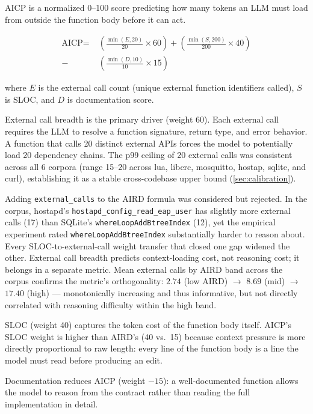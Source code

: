 \documentclass[10pt,twocolumn,letterpaper]{article}
\begin{document}
AICP is a normalized 0--100 score predicting how many tokens an LLM
must load from outside the function body before it can act.

\begin{align}
\text{AICP} = &\;\left(\frac{\min(E, 20)}{20} \times 60\right)
             + \left(\frac{\min(S, 200)}{200} \times 40\right) \nonumber \\
             - &\;\left(\frac{\min(D, 10)}{10} \times 15\right)
\label{eq:aicp}
\end{align}

where $E$ is the external call count (unique external function
identifiers called), $S$ is SLOC, and $D$ is documentation score.

External call breadth is the primary driver (weight 60).  Each external
call requires the LLM to resolve a function signature, return type, and
error behavior.  A function that calls 20 distinct external APIs forces
the model to potentially load 20 dependency chains.  The p99 ceiling of
20 external calls was consistent across all 6 corpora (range 15--20
across lua, libcrc, mosquitto, hostap, sqlite, and curl), establishing
it as a stable cross-codebase upper bound (\cref{sec:calibration}).

Adding \texttt{external\_calls} to the AIRD formula was considered but
rejected.  In the corpus, hostapd's \texttt{hostapd\_config\_read\_eap\_user}
has slightly more external calls (17) than SQLite's
\texttt{whereLoopAddBtreeIndex} (12), yet the empirical experiment rated
\texttt{whereLoopAddBtreeIndex} substantially harder to reason about.
Every SLOC-to-external-call weight transfer that closed one gap widened
the other.  External call breadth predicts context-loading cost, not
reasoning cost; it belongs in a separate metric.  Mean external calls by
AIRD band across the corpus confirms the metric's orthogonality:
$2.74$ (low AIRD) $\to$ $8.69$ (mid) $\to$ $17.40$ (high) --- monotonically
increasing and thus informative, but not directly correlated with
reasoning difficulty within the high band.

SLOC (weight 40) captures the token cost of the function body itself.
AICP's SLOC weight is higher than AIRD's (40 vs.\ 15) because context
pressure is more directly proportional to raw length: every line of the
function body is a line the model must read before producing an edit.

Documentation reduces AICP (weight $-15$): a well-documented function
allows the model to reason from the contract rather than reading the full
implementation in detail.
\end{document}
